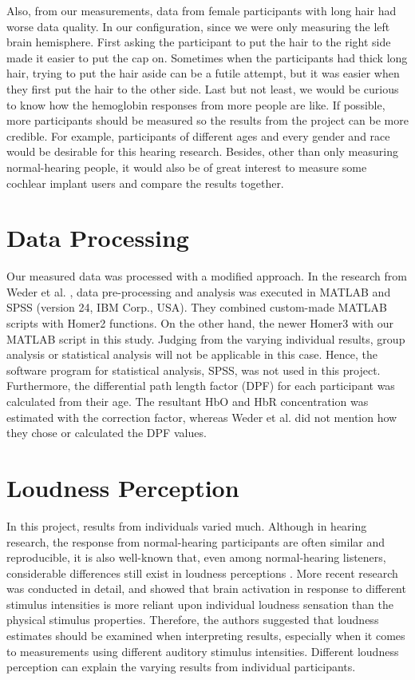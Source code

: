 Also, from our measurements, data from female participants with long hair had worse data quality. In our configuration, since we were only measuring the left brain hemisphere. First asking the participant to put the hair to the right side made it easier to put the cap on. Sometimes when the participants had thick long hair, trying to put the hair aside can be a futile attempt, but it was easier when they first put the hair to the other side. Last but not least, we would be curious to know how the hemoglobin responses from more people are like. If possible, more participants should be measured so the results from the project can be more credible. For example, participants of different ages and every gender and race would be desirable for this hearing research. Besides, other than only measuring normal-hearing people, it would also be of great interest to measure some cochlear implant users and compare the results together.

\section {Data Processing}
Our measured data was processed with a modified approach. In the research from Weder et al. \citeyearpar{Weder2018}, data pre-processing and analysis was executed in MATLAB and SPSS (version 24, IBM Corp., USA). They combined custom-made MATLAB scripts with Homer2 \citep{Huppert:09} functions. On the other hand, the newer Homer3 \citep{Huppert:09} with our MATLAB script in this study. Judging from the varying individual results, group analysis or statistical analysis will not be applicable in this case. Hence, the software program for statistical analysis, SPSS, was not used in this project. Furthermore, the differential path length factor (DPF) for each participant was calculated from their age. The resultant HbO and HbR concentration was estimated with the correction factor, whereas Weder et al. \citeyearpar{Weder2018} did not mention how they chose or calculated the DPF values.

\section{Loudness Perception}
In this project, results from individuals varied much. Although in hearing research, the response from normal-hearing participants are often similar and reproducible, it is also well-known that, even among normal-hearing listeners,
considerable differences still exist in loudness perceptions \citep{Brand2001}. More recent research \citep{Weder2020} was conducted in detail, and showed that brain activation in response to different stimulus intensities is more reliant upon individual loudness sensation than the physical stimulus properties. Therefore, the authors suggested that loudness
estimates should be examined when interpreting results, especially when it comes to measurements using different auditory stimulus intensities. Different loudness perception can explain the varying results from individual participants.

